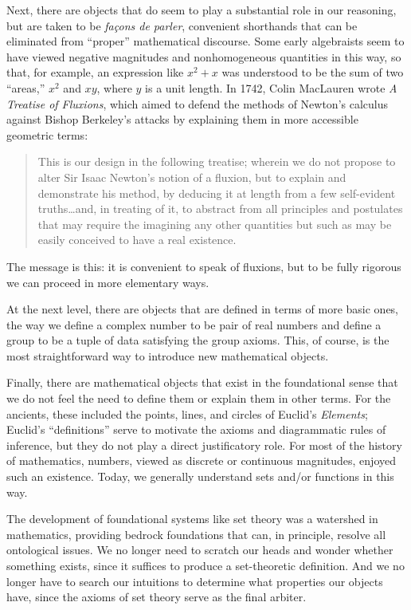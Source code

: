 \documentclass[12pt]{article}
\begin{document}
Next, there are objects that do seem to play a substantial role in our reasoning, but are taken to be \emph{fa\c{c}ons de parler}, convenient shorthands that can be eliminated from ``proper'' mathematical discourse. Some early algebraists seem to have viewed negative magnitudes and nonhomogeneous quantities in this way, so that, for example, an expression like $x^2 + x$ was understood to be the sum of two ``areas,'' $x^2$ and $xy$, where $y$ is a unit length. In 1742, Colin MacLauren wrote \emph{A Treatise of Fluxions}, which aimed to defend the methods of Newton's calculus against Bishop Berkeley's attacks by explaining them in more accessible geometric terms:
\begin{quote}
This is our design in the following treatise; wherein we do not propose to alter Sir {\sc Isaac Newton}'s notion of a fluxion, but to explain and demonstrate his method, by deducing it at length from a few self-evident truths\ldots and, in treating of it, to abstract from all principles and postulates that may require the imagining any other quantities but such as may be easily conceived to have a real existence. 
\end{quote}
The message is this: it is convenient to speak of fluxions, but to be fully rigorous we can proceed in more elementary ways.

At the next level, there are objects that are defined in terms of more basic ones, the way we define a complex number to be pair of real numbers and define a group to be a tuple of data satisfying the group axioms. This, of course, is the most straightforward way to introduce new mathematical objects. 

Finally, there are mathematical objects that exist in the foundational sense that we do not feel the need to define them or explain them in other terms. For the ancients, these included the points, lines, and circles of Euclid's \emph{Elements}; Euclid's ``definitions'' serve to motivate the axioms and diagrammatic rules of inference, but they do not play a direct justificatory role. For most of the history of mathematics, numbers, viewed as discrete or continuous magnitudes, enjoyed such an existence. Today, we generally understand sets and/or functions in this way.

The development of foundational systems like set theory was a watershed in mathematics, providing bedrock foundations that can, in principle, resolve all ontological issues. We no longer need to scratch our heads and wonder whether something exists, since it suffices to produce a set-theoretic definition. And we no longer have to search our intuitions to determine what properties our objects have, since the axioms of set theory serve as the final arbiter.
\end{document}
